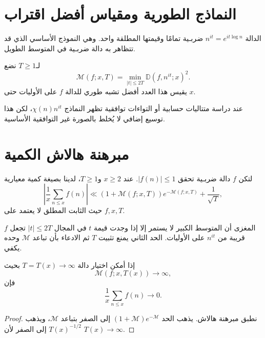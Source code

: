 \section{النماذج الطورية ومقياس أفضل اقتراب}

الدالة \(n^{it}=e^{it\log n}\) ضربـية تمامًا وقيمتها المطلقة واحد. وهي النموذج الأساسي الذي قد تتظاهر به دالة ضربـية في المتوسط الطويل.

\begin{definition}
\label{def:ch24-halasz-measure}
\provedhere
لـ\(T\ge1\) نضع
\[
\mathcal M(f;x,T)
=
\min_{|t|\le2T}
\mathbb D(f,n^{it};x)^2.
\]
يقيس هذا العدد أفضل تشبه طوري للدالة \(f\) على الأوليات حتى \(x\).
\end{definition}

عند دراسة متتاليات حسابية أو التواءات توافقية تظهر النماذج \(\chi(n)n^{it}\)، لكن هذا توسيع إضافي لا يُخلط بالصورة غير التوافقية الأساسية.

\section{مبرهنة هالاش الكمية}

\begin{theorem}
\label{thm:ch24-halasz}
لتكن \(f\) دالة ضربـية تحقق \(|f(n)|\le1\). عند \(x\ge2\) و\(T\ge1\)، لدينا بصيغة كمية معيارية
\[
\left|
\frac1x\sum_{n\le x}f(n)
\right|
\ll
(1+\mathcal M(f;x,T))e^{-\mathcal M(f;x,T)}
+
\frac1{\sqrt T},
\]
حيث الثابت المطلق لا يعتمد على \(f,x,T\).
\end{theorem}

المغزى أن المتوسط الكبير لا يستمر إلا إذا وجدت قيمة \(t\) في المجال \(|t|\le2T\) تجعل \(f\) قريبة من \(n^{it}\) على الأوليات. الحد الثاني يمنع تثبيت \(T\) ثم الادعاء بأن تباعد \(\mathcal M\) وحده يكفي.

\begin{corollary}
\label{cor:ch24-mean-cancellation}
\provedhere
إذا أمكن اختيار دالة \(T=T(x)\to\infty\) بحيث
\[
\mathcal M(f;x,T(x))\to\infty,
\]
فإن
\[
\frac1x\sum_{n\le x}f(n)\to0.
\]
\end{corollary}

\begin{proof}
نطبق مبرهنة هالاش. يذهب الحد
\((1+\mathcal M)e^{-\mathcal M}\) إلى الصفر بتباعد \(\mathcal M\)، ويذهب \(T(x)^{-1/2}\) إلى الصفر لأن \(T(x)\to\infty\).
\end{proof}

